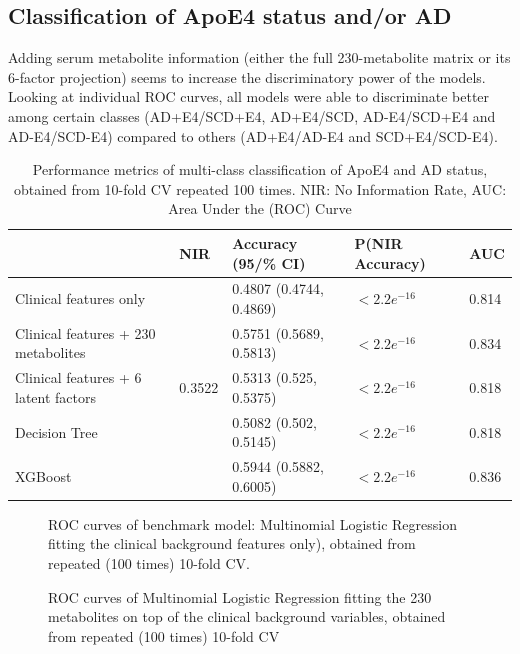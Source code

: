 \documentclass{amsart}
\begin{document}
\clearpage
\subsection{Classification of ApoE4 status and/or AD}
Adding serum metabolite information (either the full 230-metabolite matrix or its 6-factor projection) seems to increase the discriminatory power of the models.
Looking at individual ROC curves, all models were able to discriminate better among certain classes (AD+E4/SCD+E4, AD+E4/SCD, AD-E4/SCD+E4 and AD-E4/SCD-E4) compared to others (AD+E4/AD-E4 and SCD+E4/SCD-E4).
\begin{table}[H]
\caption{Performance metrics of multi-class classification of ApoE4 and AD status, obtained from 10-fold CV repeated 100 times. NIR: No Information Rate, AUC: Area Under the (ROC) Curve}
\label{tab:class_results}
\begin{tabular}{lllll} \toprule
                                     & NIR & Accuracy (95/\% CI)     & P(NIR  Accuracy) & AUC   \\ \midrule
Clinical features only & \multirow{5}{*}{0.3522} & 0.4807 (0.4744, 0.4869) &$<2.2e^{-16}$ & 0.814 \\
Clinical features + 230 metabolites  &     & 0.5751 (0.5689, 0.5813) & $<2.2e^{-16}$         & 0.834 \\
Clinical features + 6 latent factors &     & 0.5313 (0.525, 0.5375)  & $<2.2e^{-16}$      & 0.818 \\
Decision Tree                        &     & 0.5082 (0.502, 0.5145)  & $<2.2e^{-16}$        & 0.818 \\
XGBoost                              &     & 0.5944 (0.5882, 0.6005) & $<2.2e^{-16}$         & 0.836 \\ \bottomrule
\end{tabular}
\end{table}

\begin{figure}[htb]
  
  \caption{ROC curves of benchmark model: Multinomial Logistic Regression fitting the clinical background features only), obtained from repeated (100 times) 10-fold CV.}
  \label{roc:bench}
\end{figure}

\begin{figure}
  
  \caption{ROC curves of Multinomial Logistic Regression fitting the 230 metabolites on top of the clinical background variables, obtained from repeated (100 times) 10-fold CV}
  \label{roc:full}
\end{figure}
\end{document}
